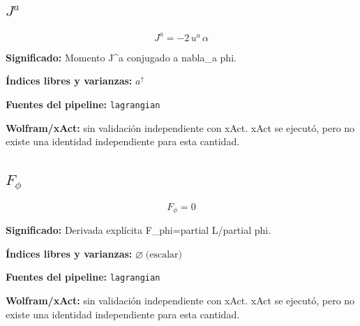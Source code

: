 \documentclass[11pt]{article}
\begin{document}
\subsection*{$ J^a $}
\begin{dmath*}[breakdepth={5}]
J^a = -2\,u{}^{a}\,\alpha
\end{dmath*}
\par\vspace{1.2\baselineskip}\noindent
\begin{minipage}{\linewidth}
\textbf{Significado:} Momento J^a conjugado a nabla\_a phi.\par
\textbf{Índices libres y varianzas:} $ a^{\uparrow} $\par
\textbf{Fuentes del pipeline:} \texttt{lagrangian}\par
\textbf{Wolfram/xAct:} sin validación independiente con xAct. xAct se ejecutó, pero no existe una identidad independiente para esta cantidad.\par
\end{minipage}
\subsection*{$ F_{\phi} $}
\begin{dmath*}[breakdepth={5}]
F_{\phi} = 0
\end{dmath*}
\par\vspace{1.2\baselineskip}\noindent
\begin{minipage}{\linewidth}
\textbf{Significado:} Derivada explícita F\_phi=partial L/partial phi.\par
\textbf{Índices libres y varianzas:} $ \varnothing\;\text{(escalar)} $\par
\textbf{Fuentes del pipeline:} \texttt{lagrangian}\par
\textbf{Wolfram/xAct:} sin validación independiente con xAct. xAct se ejecutó, pero no existe una identidad independiente para esta cantidad.\par
\end{minipage}
\end{document}
